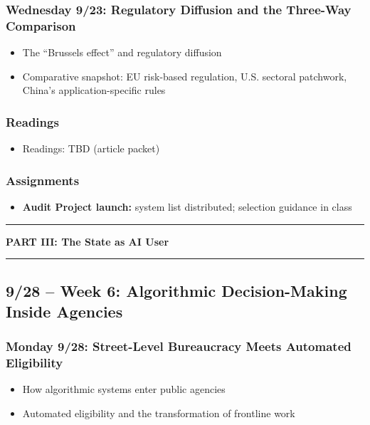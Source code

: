 \documentclass[12pt]{article}
\begin{document}
    \subsubsection*{Wednesday 9/23: Regulatory Diffusion and the Three-Way Comparison}
        \begin{itemize}
            \item The ``Brussels effect'' and regulatory diffusion
            \item Comparative snapshot: EU risk-based regulation, U.S. sectoral patchwork, China's application-specific rules
        \end{itemize}
    \subsubsection*{Readings}
        \begin{itemize}
            \item Readings: TBD (article packet)
        \end{itemize}
    \subsubsection*{Assignments}
        \begin{itemize}
            \item \textbf{Audit Project launch:} system list distributed; selection guidance in class
        \end{itemize}

\bigskip
\noindent\rule{\textwidth}{0.6pt}
\begin{center}\textbf{PART III: The State as AI User}\end{center}
\noindent\rule{\textwidth}{0.6pt}

\subsection*{9/28 -- Week 6: Algorithmic Decision-Making Inside Agencies}
    \subsubsection*{Monday 9/28: Street-Level Bureaucracy Meets Automated Eligibility}
        \begin{itemize}
            \item How algorithmic systems enter public agencies
            \item Automated eligibility and the transformation of frontline work
        \end{itemize}
\end{document}

